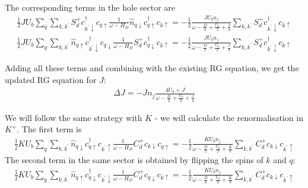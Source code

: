 \documentclass{report}
\numberwithin{equation}{section}
\begin{document}
\begin{appendices}
The corresponding terms in the hole sector are
\begin{equation}\begin{aligned}
	\frac{1}{2} J U_b \sum_{q} \sum_{k,k^\prime} S_d^+ c^\dagger_{k^\prime \downarrow} c_{q \uparrow} \frac{1}{\omega - H_D} \hat n_{q \downarrow} c^\dagger_{q \uparrow}c_{k \uparrow} = -\frac{1}{2}\frac{J U_b n_j}{\omega - \frac{D}{2} + \frac{U_b}{2} + \frac{J}{4}} \sum_{k,k^\prime} S_d^+ c^\dagger_{k^\prime \downarrow} c_{k \uparrow}
\end{aligned}\end{equation}
\begin{equation}\begin{aligned}
	\frac{1}{2} J U_b \sum_{q} \sum_{k,k^\prime} \hat n_{q \uparrow} c^\dagger_{k^\prime \downarrow} c_{q \downarrow} \frac{1}{\omega - H_D}S_d^+ c^\dagger_{q \downarrow} c_{k \uparrow} = -\frac{1}{2}\frac{J U_b n_j}{\omega - \frac{D}{2} + \frac{U_b}{2} + \frac{J}{4}} \sum_{k,k^\prime} S_d^+ c^\dagger_{k^\prime \downarrow} c_{k \uparrow}
\end{aligned}\end{equation}

Adding all these terms and combining with the existing RG equation, we get the updated RG equation for \(J\):
\begin{equation}\begin{aligned}
	\Delta J = -J n_j\frac{4 U_b + J}{\omega - \frac{D}{2} + \frac{U_b}{2} + \frac{J}{4}}
\end{aligned}\end{equation}

We will follow the same strategy with \(K\) - we will calculate the renormalisation in \(K^+\). The first term is
\begin{equation}\begin{aligned}
	\frac{1}{2} K U_b \sum_{q} \sum_{k,k^\prime} \hat n_{q \downarrow} c^\dagger_{q \uparrow}c_{k^\prime \uparrow} \frac{1}{\omega - H_D} C_d^+ c_{k \downarrow} c_{q \uparrow} = -\frac{1}{2}\frac{K U_b n_j}{\omega - \frac{D}{2} + \frac{U_b}{2} + \frac{K}{4}} \sum_{k,k^\prime} C_d^+ c_{k \downarrow} c_{k^\prime \uparrow}
\end{aligned}\end{equation}
The second term in the same sector is obtained by flipping the spins of \(k\) and \(q\):
\begin{equation}\begin{aligned}
	\frac{1}{2} K U_b \sum_{q} \sum_{k,k^\prime} \hat n_{q \uparrow} c^\dagger_{q \downarrow}c_{k^\prime \downarrow} \frac{1}{\omega - H_D} C_d^+ c_{q \downarrow} c_{k \uparrow} = -\frac{1}{2}\frac{K U_b n_j}{\omega - \frac{D}{2} + \frac{U_b}{2} + \frac{K}{4}} \sum_{k,k^\prime} C_d^+ c_{k \downarrow} c_{k^\prime \uparrow}
\end{aligned}\end{equation}


\end{appendices}
\end{document}
